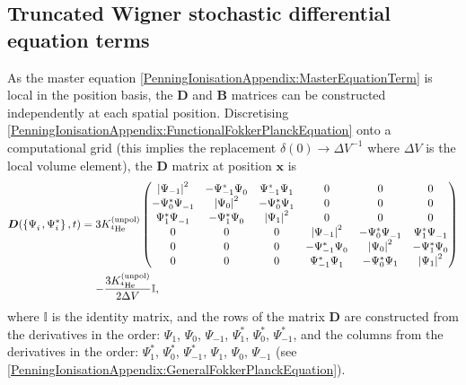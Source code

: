 \subsection{Truncated Wigner stochastic differential equation terms}

As the master equation \eqref{PenningIonisationAppendix:MasterEquationTerm} is local in the position basis, the $\bm{D}$ and $\bm{B}$ matrices can be constructed independently at each spatial position. Discretising \eqref{PenningIonisationAppendix:FunctionalFokkerPlanckEquation} onto a computational grid (this implies the replacement $\delta(0) \rightarrow \Delta V^{-1}$ where $\Delta V$ is the local volume element), the $\bm{D}$ matrix at position $\bm{x}$ is
\begin{align}
    \begin{split}
        \bm{D}(\left\{ \Psi_i^{\phantom{*}}, \Psi_i^* \right\}, t) &= 3 \Kunpol
        \begin{pmatrix}
            \abs{\Psi_{-1}}^2 & - \Psi_{-1}^* \Psi_0^{\phantom{*}} & \Psi_{-1}^* \Psi_{1}^{\phantom{*}} & 0 & 0 & 0 \\
            - \Psi_{0}^* \Psi_{-1}^{\phantom{*}} & \abs{\Psi_{0}}^2 & - \Psi_{0}^*\Psi_1^{\phantom{*}} & 0 & 0 & 0 \\
            \Psi_{1}^* \Psi_{-1}^{\phantom{*}} & - \Psi_{1}^* \Psi_0^{\phantom{*}} & \abs{\Psi_{1}}^2  & 0 & 0 & 0 \\
            0 & 0 & 0 & \abs{\Psi_{-1}}^2 & - \Psi_{0}^* \Psi_{-1}^{\phantom{*}} & \Psi_{1}^* \Psi_{-1}^{\phantom{*}} \\
            0 & 0 & 0 & - \Psi_{-1}^* \Psi_0^{\phantom{*}} & \abs{\Psi_{0}}^2 & - \Psi_{1}^* \Psi_0^{\phantom{*}} \\
            0 & 0 & 0 & \Psi_{-1}^* \Psi_{1}^{\phantom{*}} & - \Psi_0^* \Psi_1 & \abs{\Psi_1}^2
        \end{pmatrix}\\
        &\relphantom{=}- \frac{3 \Kunpol}{2 \Delta V} \mathbb{I},
    \end{split}
    \label{PenningIonisationAppendix:DMatrix}
\end{align}
where $\mathbb{I}$ is the identity matrix, and the rows of the matrix $\bm{D}$ are constructed from the derivatives in the order: $\Psi_1^{\phantom{*}}$, $\Psi_0^{\phantom{*}}$, $\Psi_{-1}^{\phantom{*}}$, $\Psi_1^*$, $\Psi_0^*$, $\Psi_{-1}^*$, and the columns from the derivatives in the order: $\Psi_1^*$, $\Psi_0^*$, $\Psi_{-1}^*$, $\Psi_1^{\phantom{*}}$, $\Psi_0^{\phantom{*}}$, $\Psi_{-1}^{\phantom{*}}$ (see \eqref{PenningIonisationAppendix:GeneralFokkerPlanckEquation}).

